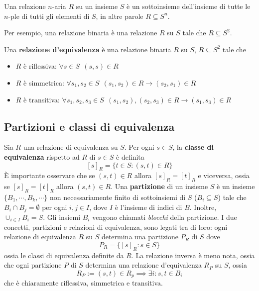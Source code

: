 \begin{defi}[Relazione]
  Una relazione $n$-aria $R$ su un insieme $S$ è 
un sottoinsieme dell'insieme di tutte le $n$-ple di tutti gli elementi di $S$, 
in altre parole $R \subseteq S^{n}$.
\end{defi}
Per esempio, una relazione binaria è 
una relazione $R$ su $S$ tale che $R \subseteq S^2$. 
\begin{defi}
Una 
\textbf{relazione d'equivalenza} è una relazione binaria $R$ su $S$, $R \subseteq S^2$ 
tale che 
\begin{itemize}
  \setlength\itemsep{0pt}
  \item $R$ è riflessiva: $\forall s \in S ~~(s,s) \in R$
  \item $R$ è simmetrica: $\forall s_1, s_2 \in S ~~ (s_1, s_2) \in R \rightarrow (s_2, s_1) \in R$
  \item $R$ è transitiva: $\forall s_1, s_2, s_3 \in S ~~ (s_1, s_2), (s_2, s_3) \in R \rightarrow (s_1, s_3) \in R$
\end{itemize}
\end{defi}

\subsection{Partizioni e classi di equivalenza}
Sia $R$ una relazione di equivalenza su $S$. Per ogni $s \in S$, la 
\textbf{classe di equivalenza} rispetto ad $R$ di $s \in S$ è definita 
$$
[s]_R = \{ t \in S : (s,t) \in R\}
$$
\`E importante osservare che se $(s,t) \in R$ allora $[s]_R = [t]_R$ e viceversa, 
ossia se $[s]_R = [t]_R$ allora $(s,t) \in R$.  Una \textbf{partizione} di 
un insieme $S$ è un insieme $\{B_1, \cdots, B_k, \cdots\}$ non necessariamente 
finito di sottoinsiemi di $S$ ($B_i \subseteq S$) tale che $B_i \cap B_j = \emptyset$ 
per ogni $i,j \in I$, dove $I$ è l'insieme di indici di $B$. Inoltre, 
$\cup_{i \in I} B_i = S$. Gli insiemi $B_i$ vengono chiamati \textit{blocchi}
della partizione. I due concetti, partizioni e relazioni di equivalenza, sono 
legati tra di loro: ogni relazione di equivalenza $R$ su $S$ determina una partizione 
$P_R$ di $S$ dove 
$$
P_R = \{[s]_R : s \in S\}
$$
ossia le classi di equivalenza definite da $R$. La relazione inversa è meno nota, 
ossia che ogni partizione $P$ di $S$ determina una relazione d'equivalenza $R_P$ 
su $S$, ossia 
$$ 
R_P := (s,t) \in R_p \implies \exists i : s,t \in B_i
$$
che è chiaramente riflessiva, simmetrica e transitiva. 

